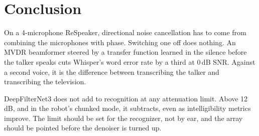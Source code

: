 \section{Conclusion}
\label{sec:conclusion}

On a 4-microphone ReSpeaker, directional noise cancellation has to come
from combining the microphones with phase. Switching one off does nothing.
An MVDR beamformer steered by a transfer function learned in the silence
before the talker speaks cuts Whisper's word error rate by a third at 0\,dB
SNR. Against a second voice, it is the difference between transcribing the
talker and transcribing the television.

DeepFilterNet3 does not add to recognition at any attenuation limit.
Above 12\,dB, and in the robot's chunked mode, it subtracts, even as
intelligibility metrics improve. The limit should be set for the
recognizer, not by ear, and the array should be pointed before the
denoiser is turned up.
